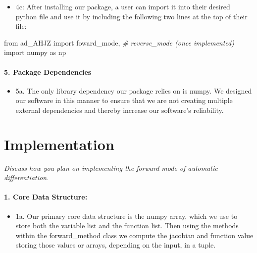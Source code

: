 \documentclass[11pt]{article}
\providecommand{\tightlist}{%
      \setlength{\itemsep}{0pt}\setlength{\parskip}{0pt}}
\newenvironment{Shaded}{}{}
\newcommand{\CommentTok}[1]{\textcolor[rgb]{0.38,0.63,0.69}{\textit{{#1}}}}
\newcommand{\NormalTok}[1]{{#1}}
\newcommand{\ImportTok}[1]{{#1}}
\begin{document}
\begin{itemize}
\tightlist
\item
  4c: After installing our package, a user can import it into their
  desired python file and use it by including the following two lines at
  the top of their file:
\end{itemize}

\begin{Shaded}
\begin{Highlighting}[]
\ImportTok{from}\NormalTok{ ad_AHJZ }\ImportTok{import}\NormalTok{ foward_mode, }\CommentTok{# reverse_mode (once implemented)}
\ImportTok{import}\NormalTok{ numpy }\ImportTok{as}\NormalTok{ np}
\end{Highlighting}
\end{Shaded}

\hypertarget{package-dependencies}{%
\paragraph{\texorpdfstring{5. \textbf{Package
Dependencies}}{5. Package Dependencies}}\label{package-dependencies}}

\begin{itemize}
\tightlist
\item
  5a. The only library dependency our package relies on is numpy. We
  designed our software in this manner to ensure that we are not
  creating multiple external dependencies and thereby increase our
  software's reliability.
\end{itemize}

    \hypertarget{implementation}{%
\section{Implementation}\label{implementation}}

    \emph{Discuss how you plan on implementing the forward mode of automatic
differentiation.}

\hypertarget{core-data-structure}{%
\paragraph{\texorpdfstring{1. \textbf{Core Data
Structure:}}{1. Core Data Structure:}}\label{core-data-structure}}

\begin{itemize}
\tightlist
\item
  1a. Our primary core data structure is the numpy array, which we use
  to store both the variable list and the function list. Then using the
  methods within the forward\_method class we compute the jacobian and
  function value storing those values or arrays, depending on the input,
  in a tuple.
\end{itemize}
\end{document}
